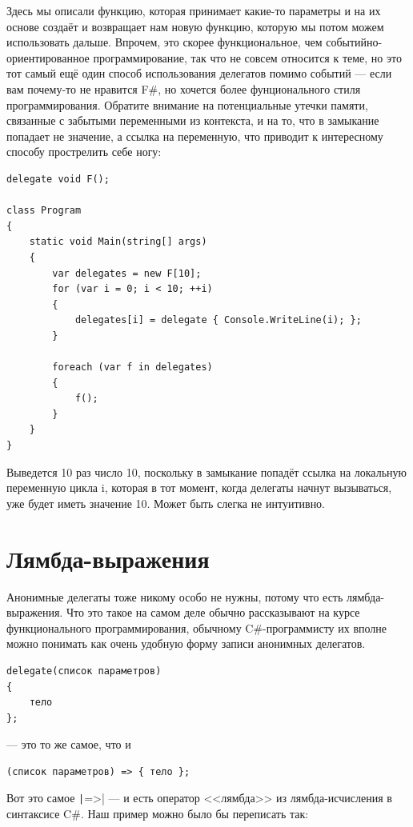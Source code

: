 \documentclass[a5paper]{article}
\begin{document}
Здесь мы описали функцию, которая принимает какие-то параметры и на их основе создаёт и возвращает нам новую функцию, которую мы потом можем использовать дальше. Впрочем, это скорее функциональное, чем событийно-ориентированное программирование, так что не совсем относится к теме, но это тот самый ещё один способ использования делегатов помимо событий --- если вам почему-то не нравится F\#, но хочется более фунционального стиля программирования. Обратите внимание на потенциальные утечки памяти, связанные с забытыми переменными из контекста, и на то, что в замыкание попадает не значение, а ссылка на переменную, что приводит к интересному способу прострелить себе ногу:

\begin{verbatim}
delegate void F();

class Program
{
    static void Main(string[] args)
    {
        var delegates = new F[10];
        for (var i = 0; i < 10; ++i)
        {
            delegates[i] = delegate { Console.WriteLine(i); };
        }

        foreach (var f in delegates)
        {
            f();
        }
    }
}
\end{verbatim}

Выведется 10 раз число 10, поскольку в замыкание попадёт ссылка на локальную переменную цикла i, которая в тот момент, когда делегаты начнут вызываться, уже будет иметь значение 10. Может быть слегка не интуитивно.

\section{Лямбда-выражения}

Анонимные делегаты тоже никому особо не нужны, потому что есть лямбда-выражения. Что это такое на самом деле обычно рассказывают на курсе функционального программирования, обычному C\#-программисту их вполне можно понимать как очень удобную форму записи анонимных делегатов.

\begin{verbatim}
delegate(список параметров)
{
    тело
};
\end{verbatim}

--- это то же самое, что и 
\begin{verbatim}
(список параметров) => { тело };
\end{verbatim}

Вот это самое \texttt|=>| --- и есть оператор <<лямбда>> из лямбда-исчисления в синтаксисе C\#. Наш пример можно было бы переписать так:
\end{document}
